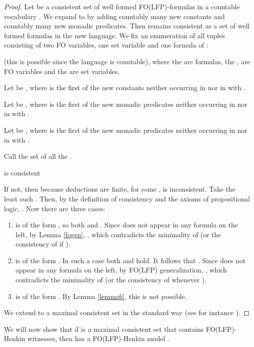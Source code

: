 \documentclass{LMCS}
\newcommand{\fo}{\textsf{FO}\xspace}
\newcommand{\folfp}{\textsf{FO(LFP)}\xspace}
\begin{document}
\begin{proof}
Let  be a consistent set of well formed \folfp-formulas in
a countable vocabulary .
We expand  to  by adding countably many new constants and countably many new monadic predicates.
Then  remains consistent as a set of well formed formulas
in the new language. We fix an enumeration of all tuples consisting of two \fo variables, one set variable and one formula
of :
\begin{center}

\end{center}
(this is possible since the language is countable), where the 
are formulas, the ,  are \fo variables and the  are set variables.
\begin{iteMize}{}
\item   Let  be ,
where  is the first of the new constants neither occurring in
 nor in  with .
\item   Let  be , where  is the
first of the new monadic predicates neither occurring in
 nor in  with .
\item   Let  be , where  is the first of the new monadic predicates neither occurring in  nor in
 with .
\end{iteMize}

\noindent Call  the set of all the .

\begin{clm}
 is consistent
\end{clm}
If not, then because deductions are finite, for some ,
 is
inconsistent. Take the least such . Then, by the
definition of consistency and the axioms of propositional logic,
. Now there are three cases:
\begin{enumerate}[(1)]
\item     is of the form , so both  and
.
Since  does not appear in any formula on the left, by Lemma
\ref{fogen}, , which contradicts the minimality of  (or
the consistency of  if ).
\item    is of the form . In such a
case both  and  hold. It follows that  . Since  does not appear in any formula on
the left, by \folfp generalization, , which contradicts the
minimality of  (or the consistency of  whenever ).
\item    is of the form .
By Lemma \ref{lemma6}, this is not possible.
\end{enumerate}
We extend  to a maximal consistent set
 in the standard way (see for instance \cite[page 137]{Enderton}).
\end{proof}


We will now show that if  is a maximal consistent set that
contains \folfp-Henkin witnesses, then  has a \folfp-Henkin
model .
\end{document}
